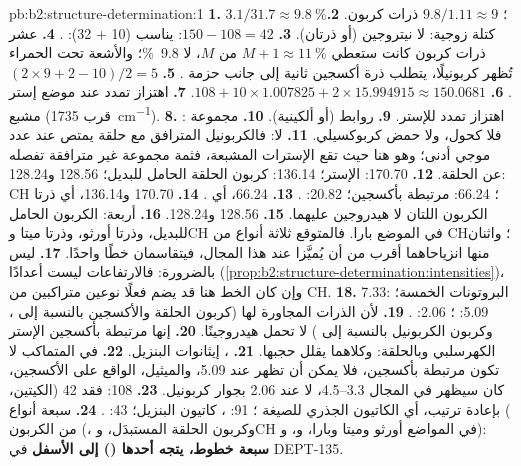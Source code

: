 \begin{solution}{pb:b2:structure-determination:1}
\textbf{1.} $3.1/31.7 \approx 9.8~\%$؛ $9.8/1.11 \approx 9$ ذرات كربون.
\textbf{2.} كتلة زوجية: لا نيتروجين (أو ذرتان).
\textbf{3.} $150 - 108 = 42$: يناسب  (10 + 32): .
\textbf{4.} عشر ذرات كربون كانت ستعطي $M+1 \approx 11~\%$ من $M$، لا 9.8~\%؛ والأشعة تحت الحمراء تُظهر
كربونيلًا، يتطلب ذرة أكسجين ثانية إلى جانب حزمة .
\textbf{5.} $(2 \times 9 + 2 - 10)/2 = 5$.
\textbf{6.} $108 + 10 \times 1.007825 + 2 \times 15.994915 \approx 150.0681$.
\textbf{7.} اهتزاز تمدد  عند موضع إستر مشبع (قرب \qty{1735}{cm^{-1}}).
\textbf{8.} اهتزاز تمدد  للإستر.
\textbf{9.} روابط   (أو ألكينية).
\textbf{10.} مجموعة : فلا كحول، ولا حمض كربوكسيلي.
\textbf{11.} لا: فالكربونيل المترافق مع حلقة يمتص عند عدد موجي أدنى؛ وهو هنا حيث تقع
الإسترات المشبعة، فثمة مجموعة غير مترافقة تفصله عن الحلقة.
\textbf{12.} 170.70:  الإستر؛ 136.14: كربون الحلقة الحامل للبديل؛ 128.56 و128.24:
CH ؛ 66.24:  مرتبطة بأكسجين؛ 20.82: .
\textbf{13.} 66.24، أي .
\textbf{14.} 170.70 و136.14، أي ذرتا الكربون اللتان لا هيدروجين عليهما.
\textbf{15.} 128.56 و128.24.
\textbf{16.} أربعة: الكربون الحامل للبديل، وذرتا أورثو، وذرتا ميتا وCH في الموضع بارا. فالمتوقع ثلاثة
أنواع من CH؛ واثنان منها انزياحاهما أقرب من أن يُميَّزا عند هذا المجال، فيتقاسمان خطًا واحدًا.
\textbf{17.} ليس بالضرورة: فالارتفاعات ليست أعدادًا (\cref{prop:b2:structure-determination:intensities})،
وإن كان الخط هنا قد يضم فعلًا نوعين متراكبين من CH.
\textbf{18.} 7.33: البروتونات  الخمسة؛ 5.09: ؛ 2.06: .
\textbf{19.} لأن الذرات المجاورة لها (كربون الحلقة والأكسجين بالنسبة إلى ، وكربون الكربونيل
بالنسبة إلى ) لا تحمل هيدروجينًا.
\textbf{20.} إنها مرتبطة بأكسجين الإستر الكهرسلبي وبالحلقة: وكلاهما يقلل حجبها.
\textbf{21.} ، إيثانوات البنزيل.
\textbf{22.} في المتماكب لا تكون  مرتبطة بأكسجين، فلا يمكن أن تظهر عند 5.09، 
والميثيل، الواقع على الأكسجين، كان سيظهر في المجال 3.3--4.5، لا عند 2.06 بجوار كربونيل.
\textbf{23.} 108: فقد 42 (الكيتين، ) بإعادة ترتيب، أي الكاتيون الجذري للصيغة
؛ 91: ، كاتيون البنزيل؛ 43: .
\textbf{24.} سبعة أنواع من الكربون (، وكربون الحلقة المستبدَل، وCH في المواضع أورثو وميتا وبارا،
و، و): \textbf{سبعة خطوط، يتجه أحدها () إلى الأسفل} في DEPT-135.
\end{solution}

